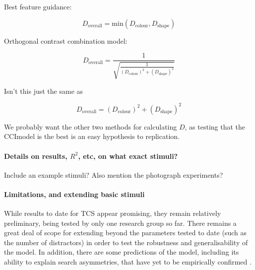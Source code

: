 \documentclass[smallextended]{svjour3}       %
\begin{document}
Best feature guidance: 

\begin{equation}
D_\text{overall} = \text{min}\left(D_\text{colour}, D_\text{shape}\right)
\end{equation}

Orthogonal contrast combination model:

\begin{equation}
D_\text{overall} = \frac{1}{\sqrt{\frac{1}{(D_\text{colour})^2 + (D_\text{shape})^2}}}
\end{equation}

Isn't this just the same as 

\begin{equation}
D_\text{overall} = (D_\text{colour})^2 + (D_\text{shape})^2
\end{equation}


We probably want the other two methods for calculating $D$, as testing that the CCImodel is the best is an easy hypothesis to replication. 

\paragraph{Details on results, $R^2$, etc, on what exact stimuli? } Include an example stimuli? Also mention the photograph experiments? 

\paragraph{Limitations, and extending basic stimuli} While results to date for TCS appear promising, they remain relatively preliminary, being tested by only one research group so far. There remains a great deal of scope for extending beyond the parameters tested to date (such as the number of distractors) in order to test the robustness and generalisability of the model. In addition, there are some predictions of the model, including its ability to explain search asymmetries, that have yet to be empirically confirmed \cite{lleras2020target}.
\end{document}

